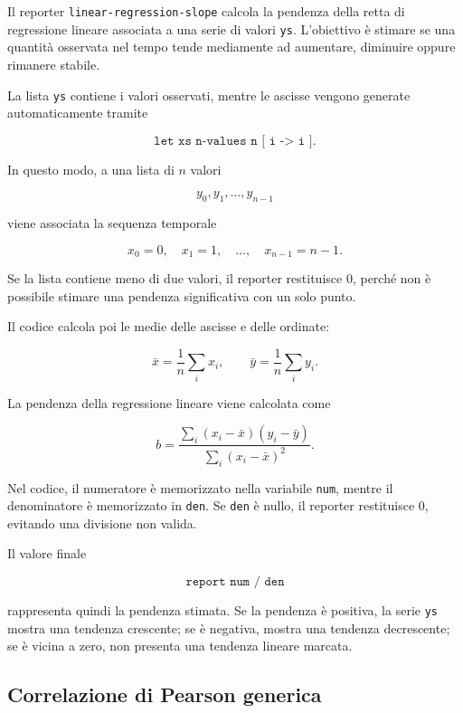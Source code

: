 Il reporter \texttt{linear-regression-slope} calcola la pendenza della retta di
regressione lineare associata a una serie di valori \texttt{ys}. L'obiettivo è
stimare se una quantità osservata nel tempo tende mediamente ad aumentare,
diminuire oppure rimanere stabile.

La lista \texttt{ys} contiene i valori osservati, mentre le ascisse vengono
generate automaticamente tramite

\[
\texttt{let xs n-values n [ i -> i ]}.
\]

In questo modo, a una lista di \(n\) valori

\[
y_0,y_1,\dots,y_{n-1}
\]

viene associata la sequenza temporale

\[
x_0=0,\quad x_1=1,\quad \dots,\quad x_{n-1}=n-1.
\]

Se la lista contiene meno di due valori, il reporter restituisce \(0\), perché
non è possibile stimare una pendenza significativa con un solo punto.

Il codice calcola poi le medie delle ascisse e delle ordinate:

\[
\bar{x} = \frac{1}{n}\sum_i x_i,
\qquad
\bar{y} = \frac{1}{n}\sum_i y_i.
\]

La pendenza della regressione lineare viene calcolata come

\[
b =
\frac{
\sum_i (x_i-\bar{x})(y_i-\bar{y})
}{
\sum_i (x_i-\bar{x})^2
}.
\]

Nel codice, il numeratore è memorizzato nella variabile \texttt{num}, mentre il
denominatore è memorizzato in \texttt{den}. Se \texttt{den} è nullo, il reporter
restituisce \(0\), evitando una divisione non valida.

Il valore finale

\[
\texttt{report num / den}
\]

rappresenta quindi la pendenza stimata. Se la pendenza è positiva, la serie
\texttt{ys} mostra una tendenza crescente; se è negativa, mostra una tendenza
decrescente; se è vicina a zero, non presenta una tendenza lineare marcata.

\subsection{Correlazione di Pearson generica}

